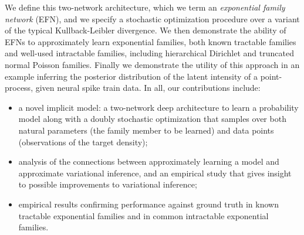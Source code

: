 \documentclass{article}
\begin{document}
We define this two-network architecture, which we term an \emph{exponential family network} (EFN), and we specify a stochastic optimization procedure over a variant of the typical Kullback-Leibler divergence.  
We then demonstrate the ability of EFNs to approximately learn exponential families, both known tractable families and well-used intractable families, including hierarchical Dirichlet and truncated normal Poisson families.  
Finally we demonstrate the utility of this approach in an example inferring the posterior distribution of the latent intensity of a point-process, given neural spike train data.  
In all, our contributions include: 
\begin{itemize}
\item a novel implicit model: a two-network deep architecture to learn a probability model along with a doubly stochastic optimization that samples over both natural parameters (the family member to be learned) and data points (observations of the target density);
\item analysis of the connections between approximately learning a model and approximate variational inference, and an empirical study that gives insight to possible improvements to variational inference;
\item empirical results confirming performance against ground truth in known tractable exponential families and in common intractable exponential families.
\end{itemize}
\end{document}
